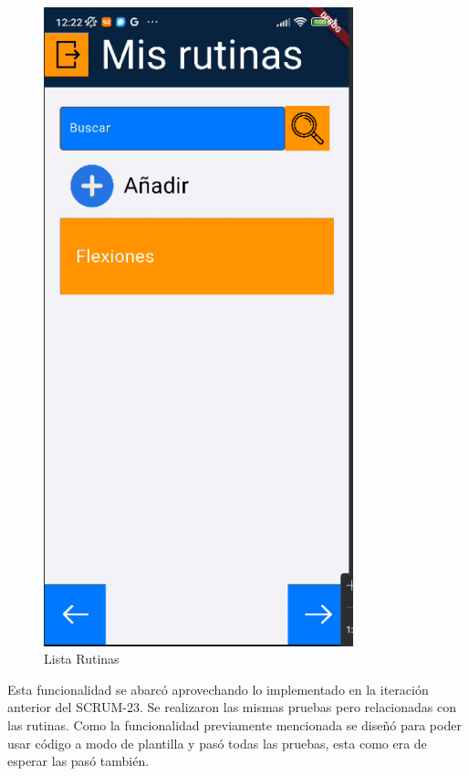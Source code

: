 \begin{figure}[H]
   \centering
    \includegraphics[width=0.8\textwidth]{pantallas/listaRutinas.png}
    \caption{Lista Rutinas}
    \label{fig:listaRutinas}
\end{figure}

Esta funcionalidad se abarcó aprovechando lo implementado en la iteración anterior del SCRUM-23. Se realizaron las mismas pruebas pero relacionadas con las rutinas. Como la funcionalidad previamente mencionada se diseñó para poder usar código a modo de plantilla y pasó todas las pruebas, esta como era de esperar las pasó también.

